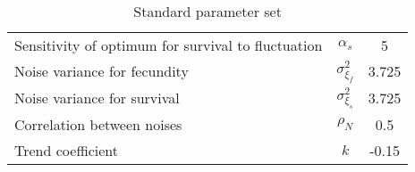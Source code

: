 \begin{table}
\begin{center}
\begin{tabular}{l c c}
		Sensitivity of optimum for survival to fluctuation & $\alpha_{s}$ & 5 \\
		Noise variance for fecundity & $\sigma_{\xi_{f}}^2$ & 3.725 \\
		Noise variance for survival & $\sigma_{\xi_{s}}^2$ & 3.725 \\
		Correlation between noises & $\rho_{N}$ & 0.5 \\
		Trend coefficient & $k$ & -0.15 \\
		\hline \hline
	\end{tabular}
	\caption{Standard parameter set}
	\label{tab:params}
\end{center}
\end{table}

%
%
%
%
